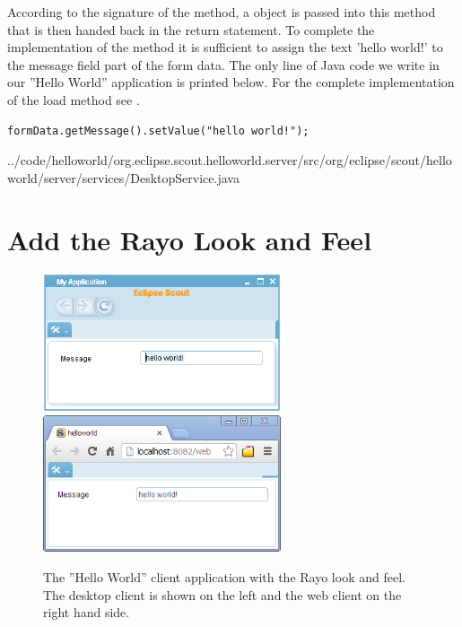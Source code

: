 \documentclass[a4paper,10pt,twoside]{book}
\begin{document}
According to the signature of the  method, a  object is passed into this method that is then handed back in the return statement.
To complete the implementation of the  method it is sufficient to assign the text 'hello world!' to the message field part of the form data.
The only line of Java code we write in our ''Hello World'' application is printed below.
For the complete implementation of the load method see .

\begin{lstlisting}[backgroundcolor=\color{white}]
  formData.getMessage().setValue("hello world!");
\end{lstlisting}


{../code/helloworld/org.eclipse.scout.helloworld.server/src/org/eclipse/scout/helloworld/server/services/DesktopService.java}

\section{Add the Rayo Look and Feel}

\begin{figure}
\includegraphics[width=7cm]{helloworld_message_swing_rayo.png} \hspace{5mm}
\includegraphics[width=7cm]{helloworld_message_rap_rayo.png}
\caption{The ''Hello World'' client application with the Rayo look and feel. The desktop client is shown on the left and the web client on the right hand side.}
\end{figure}
\end{document}
